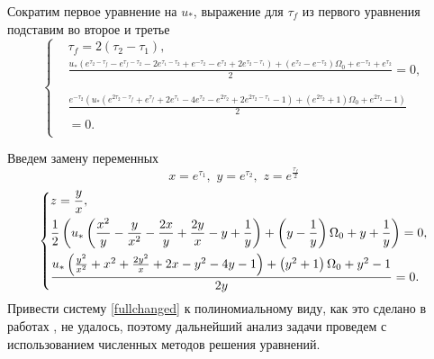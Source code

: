 \documentclass[a4paper,14pt]{article}
\theoremstyle{plain} %
\theoremstyle{definition} %
\theoremstyle{remark} %
\begin{document}
{Сократим первое уравнение на $u_*$, выражение для $\tau_f$ из первого уравнения подставим во второе и третье
\begin{equation}\label{fullconnected}
    \left\{ {\begin{aligned}
                 & \tau_f=2(\tau_2-\tau_1),                                               \\
                 & \frac{u_* \left(e^{\tau _2-\tau _f}-e^{\tau _f-\tau _2}-2 e^{\tau
                    _1-\tau _2}+e^{-\tau _2}-e^{\tau _2}+2 e^{\tau _2-\tau
                    _1}\right)+\left(e^{\tau _2}-e^{-\tau _2}\right) \Omega _0+e^{-\tau
                _2}+e^{\tau _2}}{2} =0,                                                   \\                                                \\                                         \\
                 & \frac{e^{-\tau _2} \left(u_* \left(e^{2 \tau _2-\tau _f}+e^{\tau _f}+2
                    e^{\tau _1}-4 e^{\tau _2}-e^{2 \tau _2}+2 e^{2 \tau _2-\tau
                        _1}-1\right)+\left(e^{2 \tau _2}+1\right) \Omega _0+e^{2 \tau
                _2}-1\right)}{2}                                                          \\
                 & =0.                                                                    \\
            \end{aligned}} \right.
\end{equation}

Введем замену переменных
\[
    x=e^{\tau_1} ,\,\,y=e^{\tau_2} ,\,\,z=e^{\frac{\tau_f}{2}}
\]
\begin{equation}\label{fullchanged}
    \left\{ {\begin{aligned}
                 & z=\frac{y}{x}, \hfill                                                         \\
                 & \frac{1}{2} \left(u_* \left(\frac{x^2}{y}-\frac{y}{x^2}-\frac{2 x}{y}+\frac{2
                        y}{x}-y+\frac{1}{y}\right)+\left(y-\frac{1}{y}\right) \Omega
                _0+y+\frac{1}{y}\right)=0, \hfill                                                \\
                 & \frac{u_* \left(\frac{y^2}{x^2}+x^2+\frac{2 y^2}{x}+2 x-y^2-4
                y-1\right)+\left(y^2+1\right) \Omega _0+y^2-1}{2 y}=0. \hfill                    \\
            \end{aligned}} \right.
\end{equation}
Привести систему \eqref{fullchanged} к полиномиальному виду, как это сделано в работах \cite{PAKrychinin,kurscah}, не удалось, поэтому
дальнейший анализ задачи проведем с использованием численных методов решения уравнений.


}
\end{document}

